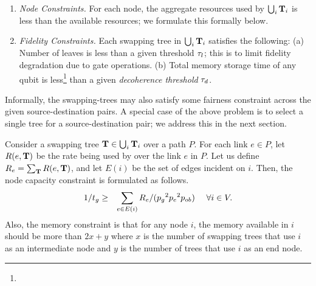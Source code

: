 \begin{enumerate}
    \item \textit{Node Constraints.} For each node, the aggregate resources used by $\bigcup_i \mathbf{T}_i$ is less than the available resources; we formulate this formally below.
    \item \textit{Fidelity Constraints.} Each swapping tree in $\bigcup_i \mathbf{T}_i$ satisfies the following: (a) Number of leaves is less than a given threshold $\tau_l$; this is to limit fidelity degradation due to gate operations. (b) Total memory storage time of any qubit is 
    less\footnote{}
    than a given \textit{decoherence threshold} $\tau_d$.
\end{enumerate}
Informally, the swapping-trees may also satisfy some fairness constraint across the given 
source-destination pairs. A special case of the above \qnr problem is to select a single tree
for a source-destination pair; we address this in the next section. 

Consider a swapping tree $\mathbf{T} \in \bigcup_i \mathbf{T}_i$  over a path $P$. For each link
$e \in P$, let $R(e, \mathbf{T})$ be the \eps rate  being used by \T over the link $e$ in $P$. 
Let us define $R_e = \sum_{\mathbf{T}}  R(e,\mathbf{T})$, and let $E(i)$ be the set of edges incident on $i$.
Then, the node capacity constraint is formulated as follows.
\begin{eqnarray}
1/\mbox{$t_g$} &\geq& \sum_{e \in E(i)} R_e/(\mbox{$p_g$}^2\mbox{$p_e$}^2\mbox{$p_{ob}$}) \ \ \ \  \forall i \in V. \label{eqn:swapping_qnr-1}
\end{eqnarray}
Also, the memory constraint is that for any node $i$, the memory available in $i$ should be more than $2x + y$ where $x$ is the number of swapping trees that use $i$ as an intermediate node 
and $y$ is the number of trees that use $i$ as an end node. 



